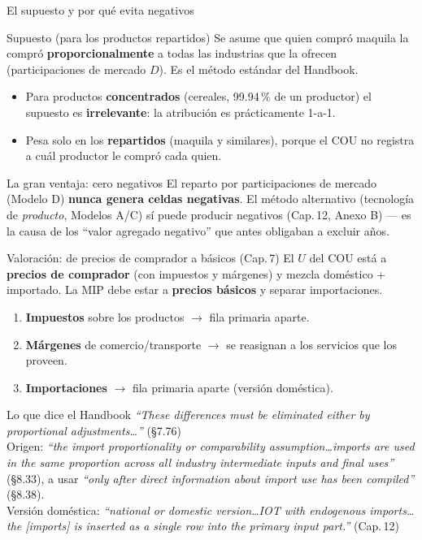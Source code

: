 \documentclass[aspectratio=169,10pt]{beamer}
\newcommand{\hb}[1]{\textit{\color{gris}\small ``#1''}}
\begin{document}
\begin{frame}{El supuesto y por qué evita negativos}
  \begin{block}{Supuesto (para los productos repartidos)}
  Se asume que quien compró maquila la compró \textbf{proporcionalmente} a todas las industrias que la ofrecen (participaciones de mercado $D$). Es el método estándar del Handbook.
  \end{block}
  \begin{itemize}
    \item Para productos \textbf{concentrados} (cereales, 99.94\,\% de un productor) el supuesto es \textbf{irrelevante}: la atribución es prácticamente 1-a-1.
    \item Pesa solo en los \textbf{repartidos} (maquila y similares), porque el COU no registra a cuál productor le compró cada quien.
  \end{itemize}
  \begin{alertblock}{La gran ventaja: cero negativos}
  El reparto por participaciones de mercado (Modelo D) \textbf{nunca genera celdas negativas}.
  El método alternativo (tecnología de \emph{producto}, Modelos A/C) sí puede producir negativos
  \footnotesize\color{gris}(Cap.\,12, Anexo B) — es la causa de los ``valor agregado negativo'' que antes obligaban a excluir años.
  \end{alertblock}
\end{frame}

\begin{frame}{Valoración: de precios de comprador a básicos (Cap.\,7)}
  El $U$ del COU está a \textbf{precios de comprador} (con impuestos y márgenes) y mezcla doméstico + importado.
  La MIP debe estar a \textbf{precios básicos} y separar importaciones.
  \begin{enumerate}
    \item \textbf{Impuestos} sobre los productos $\to$ fila primaria aparte.
    \item \textbf{Márgenes} de comercio/transporte $\to$ se reasignan a los servicios que los proveen.
    \item \textbf{Importaciones} $\to$ fila primaria aparte (versión doméstica).
  \end{enumerate}
  \begin{block}{Lo que dice el Handbook}
  \hb{These differences must be eliminated either by proportional adjustments\ldots} (\S7.76) \\[2pt]
  Origen: \hb{the import proportionality or comparability assumption\ldots imports are used in the same proportion across all industry intermediate inputs and final uses} (\S8.33), a usar \hb{only after direct information about import use has been compiled} (\S8.38). \\[2pt]
  Versión doméstica: \hb{national or domestic version\ldots IOT with endogenous imports\ldots the [imports] is inserted as a single row into the primary input part.} (Cap.\,12)
  \end{block}
\end{frame}
\end{document}
